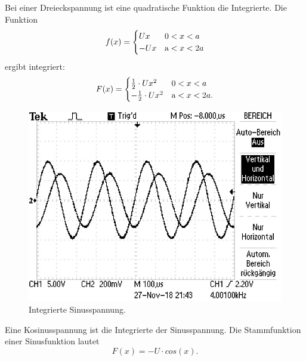 \noindent Bei einer Dreieckspannung ist eine quadratische Funktion die Integrierte.
Die Funktion
\begin{equation*}
  f(x) =
  \begin{cases}
    Ux & \text 0 < x < a \\
    -Ux & \text a < x < 2a \\
  \end{cases}
\end{equation*}
ergibt integriert:
\begin{equation*}
  F(x) =
  \begin{cases}
    \frac{1}{2} \cdot Ux^2 & \text 0 < x < a \\
    -\frac{1}{2} \cdot Ux^2 & \text a < x < 2a .\\
  \end{cases}
\end{equation*}
\begin{figure}[H]
  \centering
  \includegraphics{Sinus.JPG}
  \caption{Integrierte Sinusspannung.}
  \label{fig:plot}
\end{figure}
\noindent Eine Kosinusspannung ist die Integrierte der Sinusspannung.
Die Stammfunktion einer Sinusfunktion lautet
\begin{equation*}
  F(x) = -U \cdot cos(x) .
\end{equation*}



